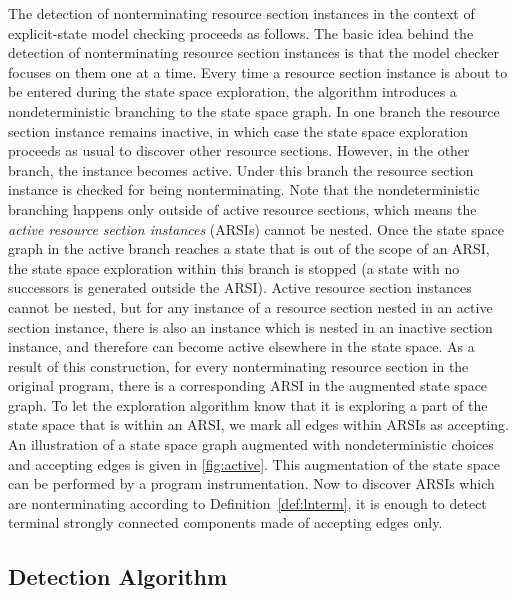 The detection of nonterminating resource section instances in the context of
explicit-state model checking proceeds as follows. The basic idea behind the
detection of nonterminating resource section instances is that the model checker
focuses on them one at a time. Every time a resource section instance is about
to be entered during the state space exploration, the algorithm introduces a
nondeterministic branching to the state space graph. In one branch the resource
section instance remains inactive, in which case the state space exploration
proceeds as usual to discover other resource sections. However, in the other
branch, the instance becomes active. Under this branch the resource section
instance is checked for being nonterminating. Note that the nondeterministic
branching happens only outside of active resource sections, which means the
\emph{active resource section instances} (ARSIs) cannot be nested.  Once the
state space graph in the active branch reaches a state that is out of the scope of an ARSI, the state
space exploration within this branch is stopped (a state with no successors is
generated outside the ARSI). Active resource section instances cannot be
nested, but for any instance of a resource section nested in an active section
instance, there is also an instance which is nested in an inactive section
instance, and therefore can become active elsewhere in the state space.  As a
result of this construction, for every nonterminating resource section in the
original program, there is a corresponding ARSI in the augmented state space
graph. To let the exploration algorithm know that it is exploring a part of the
state space that is within an ARSI, we mark all edges within ARSIs as accepting.
An illustration of a state space graph augmented with nondeterministic choices
and accepting edges is given in \autoref{fig:active}. This augmentation of the state
space can be performed by a program instrumentation.  Now to discover ARSIs which
are nonterminating according to Definition~\ref{def:lnterm}, it is enough to
detect terminal strongly connected components made of accepting edges only.

\subsection{Detection Algorithm}

